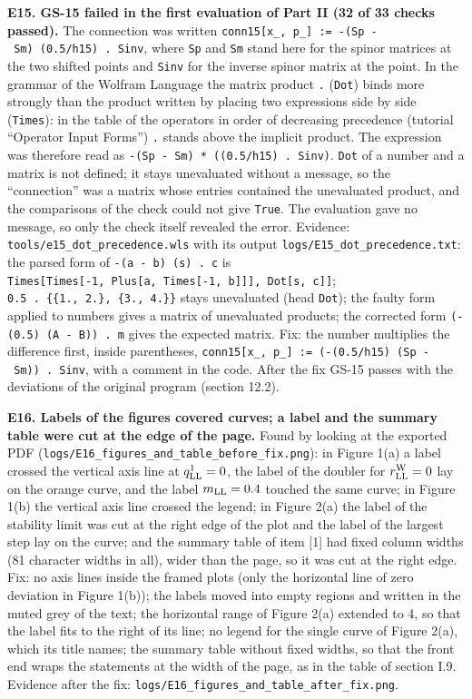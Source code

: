 \documentclass[
  10pt,
]{article}
\begin{document}
\textbf{E15. GS-15 failed in the first evaluation of Part II (32 of 33
checks passed).} The connection was written
\texttt{conn15{[}x\_,\ p\_{]}\ :=\ -(Sp\ -\ Sm)\ (0.5/h15)\ .\ Sinv},
where \texttt{Sp} and \texttt{Sm} stand here for the spinor matrices at
the two shifted points and \texttt{Sinv} for the inverse spinor matrix
at the point. In the grammar of the Wolfram Language the matrix product
\texttt{.} (\texttt{Dot}) binds more strongly than the product written
by placing two expressions side by side (\texttt{Times}): in the table
of the operators in order of decreasing precedence (tutorial ``Operator
Input Forms'') \texttt{.} stands above the implicit product. The
expression was therefore read as
\texttt{-(Sp\ -\ Sm)\ *\ ((0.5/h15)\ .\ Sinv)}. \texttt{Dot} of a number
and a matrix is not defined; it stays unevaluated without a message, so
the ``connection'' was a matrix whose entries contained the unevaluated
product, and the comparisons of the check could not give \texttt{True}.
The evaluation gave no message, so only the check itself revealed the
error. Evidence: \texttt{tools/e15\_dot\_precedence.wls} with its output
\texttt{logs/E15\_dot\_precedence.txt}: the parsed form of
\texttt{-(a\ -\ b)\ (s)\ .\ c} is
\texttt{Times{[}Times{[}-1,\ Plus{[}a,\ Times{[}-1,\ b{]}{]}{]},\ Dot{[}s,\ c{]}{]}};
\texttt{0.5\ .\ \{\{1.,\ 2.\},\ \{3.,\ 4.\}\}} stays unevaluated (head
\texttt{Dot}); the faulty form applied to numbers gives a matrix of
unevaluated products; the corrected form
\texttt{(-(0.5)\ (A\ -\ B))\ .\ m} gives the expected matrix. Fix: the
number multiplies the difference first, inside parentheses,
\texttt{conn15{[}x\_,\ p\_{]}\ :=\ (-(0.5/h15)\ (Sp\ -\ Sm))\ .\ Sinv},
with a comment in the code. After the fix GS-15 passes with the
deviations of the original program (section 12.2).

\textbf{E16. Labels of the figures covered curves; a label and the
summary table were cut at the edge of the page.} Found by looking at the
exported PDF (\texttt{logs/E16\_figures\_and\_table\_before\_fix.png}):
in Figure 1(a) a label crossed the vertical axis line at
\(q^1_{\rm LL}=0\), the label of the doubler for
\(r^{\rm W}_{\rm LL}=0\) lay on the orange curve, and the label
\(m_{\rm LL}=0.4\) touched the same curve; in Figure 1(b) the vertical
axis line crossed the legend; in Figure 2(a) the label of the stability
limit was cut at the right edge of the plot and the label of the largest
step lay on the curve; and the summary table of item {[}1{]} had fixed
column widths (81 character widths in all), wider than the page, so it
was cut at the right edge. Fix: no axis lines inside the framed plots
(only the horizontal line of zero deviation in Figure 1(b)); the labels
moved into empty regions and written in the muted grey of the text; the
horizontal range of Figure 2(a) extended to 4, so that the label fits to
the right of its line; no legend for the single curve of Figure 2(a),
which its title names; the summary table without fixed widths, so that
the front end wraps the statements at the width of the page, as in the
table of section I.9. Evidence after the fix:
\texttt{logs/E16\_figures\_and\_table\_after\_fix.png}.
\end{document}
